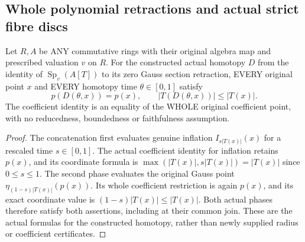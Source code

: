 \subsection{Whole polynomial retractions and actual strict fibre discs}
\begin{lemma}
\label{analytic:polynomial-retraction-fibre-bounds}
\leanok
{}
Let $R,A$ be ANY commutative rings with their original algebra map and
prescribed valuation $v$ on $R$. For the constructed actual
homotopy $D$ from the identity of $\operatorname{Sp}_v(A[T])$ to its zero
Gauss section retraction, EVERY original point $x$ and EVERY homotopy time
$\theta\in[0,1]$ satisfy
\[
 p(D(\theta,x))=p(x),\qquad |T(D(\theta,x))|\leq |T(x)|.
\]
The coefficient identity is an equality of the WHOLE original coefficient
point, with no reducedness, boundedness or faithfulness assumption.
\end{lemma}
\begin{proof}
The concatenation first evaluates genuine inflation
$I_{s|T(x)|}(x)$ for a rescaled time $s\in[0,1]$. The actual coefficient
identity for inflation retains $p(x)$, and its coordinate formula is
$\max(|T(x)|,s|T(x)|)=|T(x)|$ since $0\leq s\leq1$.
The second phase evaluates the original Gauss point
$\eta_{(1-s)|T(x)|}(p(x))$. Its whole coefficient restriction is again
$p(x)$, and its exact coordinate value is $(1-s)|T(x)|\leq|T(x)|$.
Both actual phases therefore satisfy both assertions, including at their
common join. These are the actual formulas for the constructed
homotopy, rather than newly supplied radius or coefficient certificates.
\end{proof}


